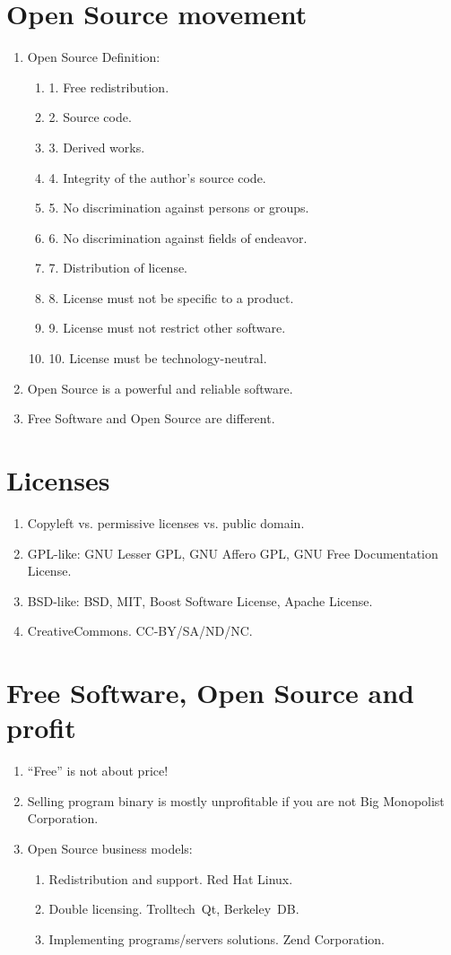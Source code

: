 \documentclass[10pt,a4paper]{article}
\newcommand{\bee}{\begin{enumerate}}
\newcommand{\ene}{\end{enumerate}}
\begin{document}
\section{Open Source movement}
\bee
  \item Open Source Definition:
  \bee
    \item[1.] Free redistribution.
    \item[2.] Source code.
    \item[3.] Derived works.
    \item[4.] Integrity of the author's source code.
    \item[5.] No discrimination against persons or groups.
    \item[6.] No discrimination against fields of endeavor.
    \item[7.] Distribution of license.
    \item[8.] License must not be specific to a product.
    \item[9.] License must not restrict other software.
    \item[10.] License must be technology-neutral.
  \ene
  \item Open Source is a powerful and reliable software.
  \item Free Software and Open Source are different.
\ene

\section{Licenses}
\bee
  \item Copyleft vs. permissive licenses vs. public domain.
  \item GPL-like: GNU Lesser GPL, GNU Affero GPL, GNU Free Documentation License.
  \item BSD-like: BSD, MIT, Boost Software License, Apache License.
  \item CreativeCommons. CC-BY/SA/ND/NC.
\ene

\section{Free Software, Open Source and profit}
\bee
  \item ``Free'' is not about price!
  \item Selling program binary is mostly unprofitable if you are not Big Monopolist Corporation.
  \item Open Source business models:
  \bee
    \item Redistribution and support. Red Hat Linux.
    \item Double licensing. Trolltech~Qt, Berkeley~DB.
    \item Implementing programs/servers solutions. Zend Corporation.
  \ene
\ene
\end{document}
